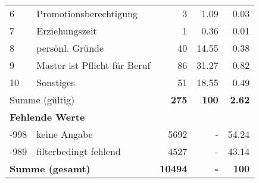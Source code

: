 \begin{longtable}{lXrrr}
     6 &
     \multicolumn{1}{X}{ Promotionsberechtigung   } &


       \num{3} &
       \num[round-mode=places,round-precision=2]{1,09} &
         \num[round-mode=places,round-precision=2]{0,03} \\

     7 &
     \multicolumn{1}{X}{ Erziehungszeit   } &


       \num{1} &
       \num[round-mode=places,round-precision=2]{0,36} &
         \num[round-mode=places,round-precision=2]{0,01} \\

     8 &
     \multicolumn{1}{X}{ persönl. Gründe   } &


       \num{40} &
       \num[round-mode=places,round-precision=2]{14,55} &
         \num[round-mode=places,round-precision=2]{0,38} \\

     9 &
     \multicolumn{1}{X}{ Master ist Pflicht für Beruf   } &


       \num{86} &
       \num[round-mode=places,round-precision=2]{31,27} &
         \num[round-mode=places,round-precision=2]{0,82} \\

     10 &
     \multicolumn{1}{X}{ Sonstiges   } &


       \num{51} &
       \num[round-mode=places,round-precision=2]{18,55} &
         \num[round-mode=places,round-precision=2]{0,49} \\
     \midrule
     \multicolumn{2}{l}{Summe (gültig)} &
       \textbf{\num{275}} &
     \textbf{100} &
       \textbf{\num[round-mode=places,round-precision=2]{2,62}} \\
     \multicolumn{5}{l}{\textbf{Fehlende Werte}}\\
       -998 &
       keine Angabe &
         \num{5692} &
        - &
         \num[round-mode=places,round-precision=2]{54,24} \\
       -989 &
       filterbedingt fehlend &
         \num{4527} &
        - &
         \num[round-mode=places,round-precision=2]{43,14} \\
     \midrule
     \multicolumn{2}{l}{\textbf{Summe (gesamt)}} &
          \textbf{\num{10494}} &
        \textbf{-} &
        \textbf{100} \\
     \bottomrule
     \end{longtable}
     
